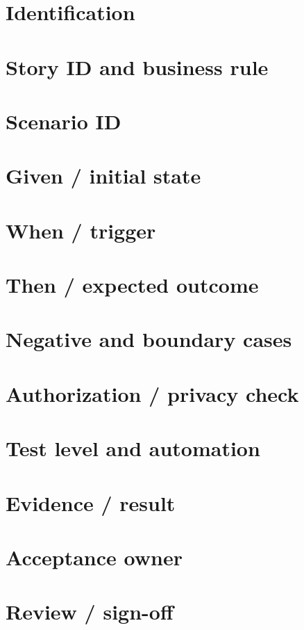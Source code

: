 \documentclass[11pt,letterpaper]{article}
\begin{document}
\section{Identification}
\section{Story ID and business rule}
\section{Scenario ID}
\section{Given / initial state}
\section{When / trigger}
\section{Then / expected outcome}
\clearpage
\section{Negative and boundary cases}
\section{Authorization / privacy check}
\section{Test level and automation}
\section{Evidence / result}
\clearpage
\section{Acceptance owner}
\section{Review / sign-off}
\end{document}
